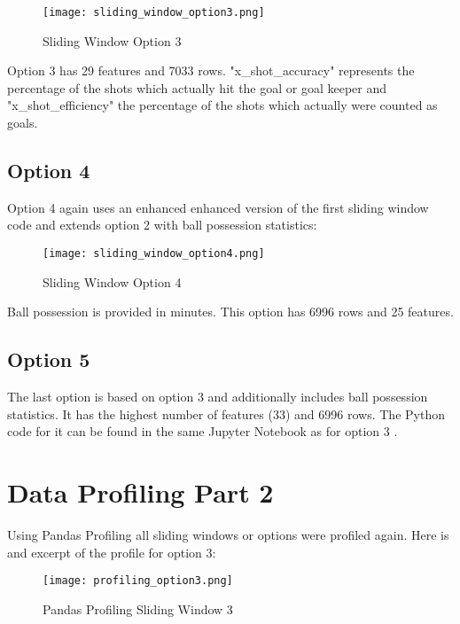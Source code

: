 \begin{figure}[H]
\begin{center}
\texttt{[image: sliding\_window\_option3.png]}
\end{center}
\caption{Sliding Window Option 3}
\label{fig:sliding_window_option3}
\end{figure}



Option 3 has 29 features and 7033 rows. "x\_shot\_accuracy" represents the percentage of the shots which actually hit the goal or goal keeper and "x\_shot\_efficiency" the percentage of the shots which actually were counted as goals.


\subsection {Option 4}

Option 4 again uses an enhanced enhanced version \cite{sliding04} of the first sliding window code and extends option 2 with ball possession statistics:

\begin{figure}[H]
\begin{center}
\texttt{[image: sliding\_window\_option4.png]}
\end{center}
\caption{Sliding Window Option 4}
\label{fig:sliding_window_option4}
\end{figure}

Ball possession is provided in minutes. This option has 6996 rows and 25 features.

\subsection {Option 5}
The last option is based on option 3 and additionally includes ball possession statistics. It has the highest number of features (33) and 6996 rows. The Python code for it can be found in the same Jupyter Notebook as for option 3 \cite{jupyter_sliding}.


\section {Data Profiling Part 2}

Using Pandas Profiling all sliding windows or options were profiled again. Here is and excerpt of the profile for option 3:

\begin{figure}[H]
\begin{center}
\texttt{[image: profiling\_option3.png]}
\end{center}
\caption{Pandas Profiling Sliding Window 3}
\label{fig:profiling_option3}
\end{figure}

